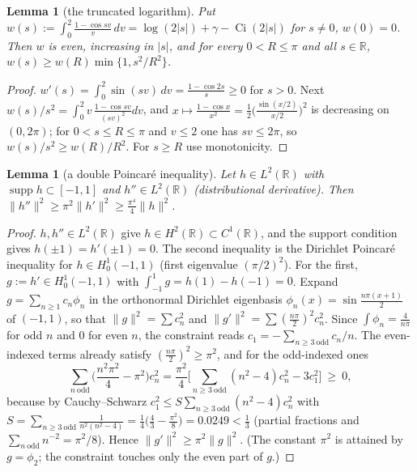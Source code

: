 \documentclass[11pt]{amsart}
\newtheorem{lemma}[theorem]{Lemma}
\theoremstyle{definition}
\theoremstyle{remark}
\newcommand{\R}{\mathbb R}
\newcommand{\supp}{\operatorname{supp}}
\begin{document}
\begin{lemma}[the truncated logarithm]\label{lem:coer-w}
Put $w(s):=\int_0^2\frac{1-\cos sv}v\,dv=\log(2|s|)+\gamma-\operatorname{Ci}(2|s|)$ for $s\ne0$, $w(0)=0$.
Then $w$ is even, increasing in $|s|$, and for every $0<R\le\pi$ and all $s\in\R$,
$w(s)\ge w(R)\min\{1,s^2/R^2\}$.
\end{lemma}
\begin{proof}
$w'(s)=\int_0^2\sin(sv)\,dv=\frac{1-\cos2s}s\ge0$ for $s>0$. Next $w(s)/s^2=\int_0^2v\,\frac{1-\cos sv}{(sv)^2}dv$,
and $x\mapsto\frac{1-\cos x}{x^2}=\frac12\big(\frac{\sin(x/2)}{x/2}\big)^2$ is decreasing on $(0,2\pi)$;
for $0<s\le R\le\pi$ and $v\le2$ one has $sv\le2\pi$, so $w(s)/s^2\ge w(R)/R^2$. For $s\ge R$ use monotonicity.
\end{proof}

\begin{lemma}[a double Poincar\'e inequality]\label{lem:coer-poinc}
Let $h\in L^2(\R)$ with $\supp h\subset[-1,1]$ and $h''\in L^2(\R)$ (distributional derivative). Then
$\|h''\|^2\ge\pi^2\|h'\|^2\ge\frac{\pi^4}4\|h\|^2$.
\end{lemma}
\begin{proof}
$h,h''\in L^2(\R)$ give $h\in H^2(\R)\subset C^1(\R)$, and the support condition gives $h(\pm1)=h'(\pm1)=0$.
The second inequality is the Dirichlet Poincar\'e inequality for $h\in H^1_0(-1,1)$ (first eigenvalue
$(\pi/2)^2$). For the first, $g:=h'\in H^1_0(-1,1)$ with $\int_{-1}^1g=h(1)-h(-1)=0$. Expand $g=\sum_{n\ge1}c_n\phi_n$
in the orthonormal Dirichlet eigenbasis $\phi_n(x)=\sin\frac{n\pi(x+1)}2$ of $(-1,1)$, so that
$\|g\|^2=\sum c_n^2$ and $\|g'\|^2=\sum(\frac{n\pi}2)^2c_n^2$. Since $\int\phi_n=\frac4{n\pi}$ for odd $n$ and
$0$ for even $n$, the constraint reads $c_1=-\sum_{n\ge3\ \mathrm{odd}}c_n/n$. The even-indexed terms already
satisfy $(\frac{n\pi}2)^2\ge\pi^2$, and for the odd-indexed ones
\[
\sum_{n\ \mathrm{odd}}\Big(\frac{n^2\pi^2}4-\pi^2\Big)c_n^2=\frac{\pi^2}4\Big[\sum_{n\ge3\ \mathrm{odd}}(n^2-4)c_n^2-3c_1^2\Big]\ \ge\ 0,
\]
because by Cauchy--Schwarz $c_1^2\le S\sum_{n\ge3\ \mathrm{odd}}(n^2-4)c_n^2$ with
$S=\sum_{n\ge3\ \mathrm{odd}}\frac1{n^2(n^2-4)}=\frac14\big(\frac43-\frac{\pi^2}8\big)=0.0249<\frac13$
(partial fractions and $\sum_{n\ \mathrm{odd}}n^{-2}=\pi^2/8$). Hence $\|g'\|^2\ge\pi^2\|g\|^2$. (The constant
$\pi^2$ is attained by $g=\phi_2$; the constraint touches only the even part of $g$.)
\end{proof}
\end{document}
